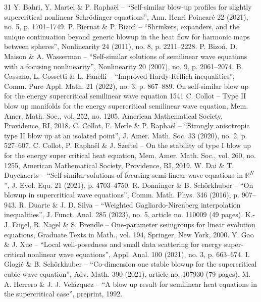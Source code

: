 \documentclass[10pt]{article}
\theoremstyle{plain}
\theoremstyle{definition}
\begin{document}
\begin{thebibliography}{31}
 Y. Bahri, Y. Martel \& P. Raphaël – “Self-similar blow-up profiles for slightly supercritical nonlinear Schrödinger equations”, Ann. Henri Poincaré 22 (2021), no. 5, p. 1701–1749.
 P. Biernat \& P. Bizoń – “Shrinkers, expanders, and the unique continuation beyond generic blowup in the heat flow for harmonic maps between spheres”, Nonlinearity 24 (2011), no. 8, p. 2211–2228.
 P. Bizoń, D. Maison \& A. Wasserman – “Self-similar solutions of semilinear wave equations with a focusing nonlinearity”, Nonlinearity 20 (2007), no. 9, p. 2061–2074.
 B. Cassano, L. Cossetti \& L. Fanelli – “Improved Hardy-Rellich inequalities”, Comm. Pure Appl. Math. 21 (2022), no. 3, p. 867–889. On self-similar blow up for the energy supercritical semilinear wave equation              1541
 C. Collot – Type II blow up manifolds for the energy supercritical semilinear wave equation, Mem. Amer. Math. Soc., vol. 252, no. 1205, American Mathematical Society, Providence, RI, 2018.
 C. Collot, F. Merle \& P. Raphaël – “Strongly anisotropic type II blow up at an isolated point”, J. Amer. Math. Soc. 33 (2020), no. 2, p. 527–607.
 C. Collot, P. Raphaël \& J. Szeftel – On the stability of type I blow up for the energy super critical heat equation, Mem. Amer. Math. Soc., vol. 260, no. 1255, American Mathematical Society, Providence, RI, 2019.
 W. Dai \& T. Duyckaerts – “Self-similar solutions of focusing semi-linear wave equations in $\mathbb R^N$ ”, J. Evol. Equ. 21 (2021), p. 4703–4750.
 R. Donninger \& B. Schörkhuber – “On blowup in supercritical wave equations”, Comm. Math. Phys. 346 (2016), p. 907–943.
 R. Duarte \& J. D. Silva – “Weighted Gagliardo-Nirenberg interpolation inequalities”, J. Funct. Anal. 285 (2023), no. 5, article no. 110009 (49 pages).
 K.-J. Engel, R. Nagel \& S. Brendle – One-parameter semigroups for linear evolution equations, Graduate Texts in Math., vol. 194, Springer, New York, 2000.
 Y. Gao \& J. Xue – “Local well-posedness and small data scattering for energy super-critical nonlinear wave equations”, Appl. Anal. 100 (2021), no. 3, p. 663–674.
 I. Glogić \& B. Schörkhuber – “Co-dimension one stable blowup for the supercritical cubic wave equation”, Adv. Math. 390 (2021), article no. 107930 (79 pages).
 M. A. Herrero \& J. J. Velázquez – “A blow up result for semilinear heat equations in the supercritical case”, preprint, 1992.

\end{thebibliography}
\end{document}

